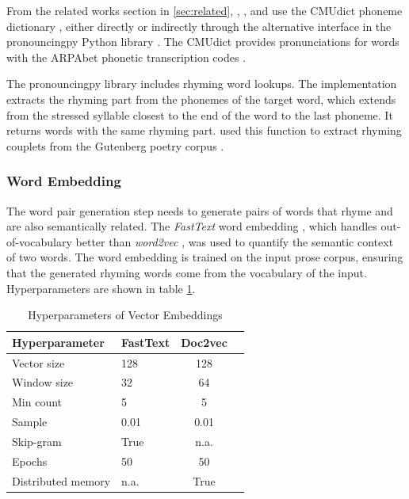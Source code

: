 \documentclass[11pt,a4paper]{article}
\begin{document}
From the related works section in \ref{sec:related}, \citet{keswarani}, \citet{cole}, and \citet{hopkins-kiela-2017} use the CMUdict phoneme dictionary \cite{cmudict}, either directly or indirectly through the alternative interface in the pronouncingpy Python library \cite{pronouncingpy}. The CMUdict provides pronunciations for words with the ARPAbet phonetic transcription codes \cite[Chapter~27]{jurafsky}.

The pronouncingpy library includes rhyming word lookups. The implementation extracts the rhyming part from the phonemes of the target word, which extends from the stressed syllable closest to the end of the word to the last phoneme. It returns words with the same rhyming part. \citet{cole} used this function to extract rhyming couplets from the Gutenberg poetry corpus \cite{gutenbergpoetry}.

\subsubsection{Word Embedding}
\label{sec:fasttext}

The word pair generation step needs to generate pairs of words that rhyme and are also semantically related. The \textit{FastText} word embedding \cite{fasttext}, which handles out-of-vocabulary better than \textit{word2vec} \cite{wordvec}, was used to quantify the semantic context of two words. The word embedding is trained on the input prose corpus, ensuring that the generated rhyming words come from the vocabulary of the input. Hyperparameters are shown in table \ref{table:HP_fasttext}.

\begin{table}[ht]
\centering
\begin{tabular}{ll c c}
	\hline\hline
	Hyperparameter & FastText & Doc2vec \\ [0.5ex]
	\hline\hline
	Vector size & 128 & 128 \\ [0.5ex]
	Window size & 32 & 64 \\ [0.5ex]
	Min count & 5 & 5 \\ [0.5ex]
	Sample & 0.01 & 0.01 \\ [0.5ex]
	Skip-gram & True & n.a. \\ [0.5ex]
	Epochs & 50 & 50 \\ [0.5ex]
	Distributed memory & n.a. & True \\ [0.5ex]
	\hline
\end{tabular}
\caption{Hyperparameters of Vector Embeddings}
\label{table:HP_fasttext}
\end{table}
\end{document}
